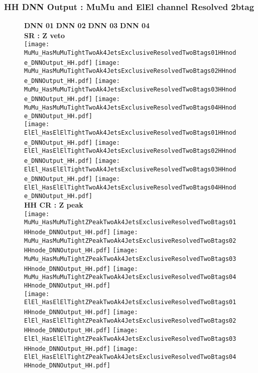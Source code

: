 \documentclass[9pt]{beamer}
\begin{document}
\begin{frame}
	\frametitle{HH DNN Output : MuMu and ElEl channel Resolved 2btag}
	\begin{figure}
	    \textbf{DNN 01} \hspace{1.2cm} \textbf{DNN 02} \hspace{1.2cm} \textbf{DNN 03} \hspace{1.2cm} \textbf{DNN 04} \\
        \centering
        \textbf{SR : Z veto} \\
		\texttt{[image: MuMu\_HasMuMuTightTwoAk4JetsExclusiveResolvedTwoBtags01HHnode\_DNNOutput\_HH.pdf]}
		\texttt{[image: MuMu\_HasMuMuTightTwoAk4JetsExclusiveResolvedTwoBtags02HHnode\_DNNOutput\_HH.pdf]}
		\texttt{[image: MuMu\_HasMuMuTightTwoAk4JetsExclusiveResolvedTwoBtags03HHnode\_DNNOutput\_HH.pdf]}
		\texttt{[image: MuMu\_HasMuMuTightTwoAk4JetsExclusiveResolvedTwoBtags04HHnode\_DNNOutput\_HH.pdf]}\\
		\texttt{[image: ElEl\_HasElElTightTwoAk4JetsExclusiveResolvedTwoBtags01HHnode\_DNNOutput\_HH.pdf]}
		\texttt{[image: ElEl\_HasElElTightTwoAk4JetsExclusiveResolvedTwoBtags02HHnode\_DNNOutput\_HH.pdf]}
		\texttt{[image: ElEl\_HasElElTightTwoAk4JetsExclusiveResolvedTwoBtags03HHnode\_DNNOutput\_HH.pdf]}
		\texttt{[image: ElEl\_HasElElTightTwoAk4JetsExclusiveResolvedTwoBtags04HHnode\_DNNOutput\_HH.pdf]}\\
        \textbf{HH CR : Z peak} \\
		\texttt{[image: MuMu\_HasMuMuTightZPeakTwoAk4JetsExclusiveResolvedTwoBtags01HHnode\_DNNOutput\_HH.pdf]}
		\texttt{[image: MuMu\_HasMuMuTightZPeakTwoAk4JetsExclusiveResolvedTwoBtags02HHnode\_DNNOutput\_HH.pdf]}
		\texttt{[image: MuMu\_HasMuMuTightZPeakTwoAk4JetsExclusiveResolvedTwoBtags03HHnode\_DNNOutput\_HH.pdf]}
		\texttt{[image: MuMu\_HasMuMuTightZPeakTwoAk4JetsExclusiveResolvedTwoBtags04HHnode\_DNNOutput\_HH.pdf]}\\
		\texttt{[image: ElEl\_HasElElTightZPeakTwoAk4JetsExclusiveResolvedTwoBtags01HHnode\_DNNOutput\_HH.pdf]}
		\texttt{[image: ElEl\_HasElElTightZPeakTwoAk4JetsExclusiveResolvedTwoBtags02HHnode\_DNNOutput\_HH.pdf]}
		\texttt{[image: ElEl\_HasElElTightZPeakTwoAk4JetsExclusiveResolvedTwoBtags03HHnode\_DNNOutput\_HH.pdf]}
		\texttt{[image: ElEl\_HasElElTightZPeakTwoAk4JetsExclusiveResolvedTwoBtags04HHnode\_DNNOutput\_HH.pdf]}\\
	\end{figure}
\end{frame}
\end{document}

